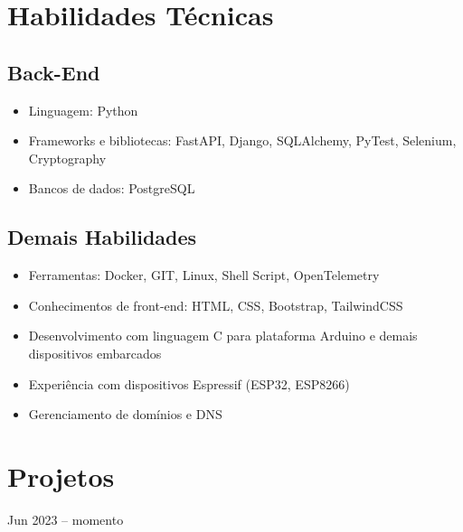 \documentclass{cv}
\begin{document}
\pagestyle{empty}

\maketitle

\section{Habilidades Técnicas}

\subsection{Back-End}

\begin{itemize}
  \item Linguagem: Python
  \item Frameworks e bibliotecas: FastAPI, Django, SQLAlchemy,
    PyTest, Selenium, Cryptography
  \item Bancos de dados: PostgreSQL
\end{itemize}

\subsection{Demais Habilidades}

\begin{itemize}
  \item Ferramentas: Docker, GIT, Linux, Shell Script, OpenTelemetry
  \item Conhecimentos de front-end: HTML, CSS, Bootstrap, TailwindCSS
  \item Desenvolvimento com linguagem C para plataforma Arduino e demais dispositivos embarcados
  \item Experiência com dispositivos Espressif (ESP32, ESP8266)
  \item Gerenciamento de domínios e DNS
\end{itemize}

\section{Projetos}

\hfill{Jun 2023 -- momento}\\
\\
\vspace{0.15cm}
\end{document}
